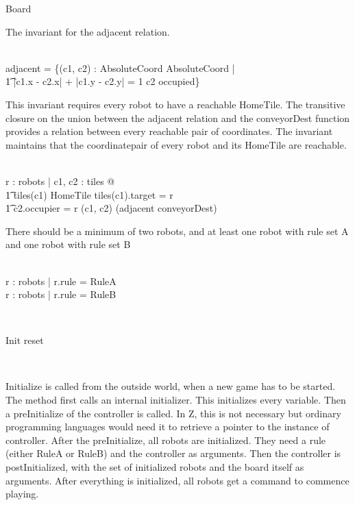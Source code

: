 \begin{class}{Board}
\begin{notopstate}
\also \also \also
\begin{zpar}
The invariant for the adjacent relation.
\end{zpar} \\
adjacent = \{(c1, c2) : AbsoluteCoord \times AbsoluteCoord | \\ \t1 |\!c1.x - c2.x\!| + |\!c1.y - c2.y\!| = 1 \wedge c2 \not \in occupied\}
\also \also \also
\begin{zpar}
This invariant requires every robot to have a reachable HomeTile.
The transitive closure on the union between the adjacent relation and the conveyorDest function
provides a relation between every reachable pair of coordinates. The invariant maintains that the coordinatepair of every robot and its HomeTile are reachable.
\end{zpar} \\
\forall r : robots | \exists c1, c2 : \dom tiles @  \\ \t1 tiles(c1) \in HomeTile \wedge tiles(c1).target = r \; \; \wedge \\ \t1
c2.occupier = r \wedge (c1, c2) \in (adjacent \cup conveyorDest)\star
\also \also \also
\begin{zpar}
There should be a minimum of two robots, and at least one robot with rule set A and one robot with rule set B
\end{zpar} \\
\exists r : \dom robots | r.rule = RuleA \\
\exists r : \dom robots | r.rule = RuleB
\end{notopstate} \\
\znewpage
\begin{schema}{Init}
reset
\end{schema} \\
\begin{zpar}
Initialize is called from the outside world, when a new game has to be
started. The method first calls an internal initializer. This initializes every variable.
Then a preInitialize of the controller is called. In Z, this is not necessary but ordinary programming languages would need it to retrieve a pointer to the instance of controller.
After the preInitialize, all robots are initialized. They need a rule (either RuleA or RuleB) and the controller as arguments.
Then the controller is postInitialized, with the set of initialized robots and the board itself as arguments.
After everything is initialized, all robots get a command to commence playing.
\end{zpar} \\

\end{class}
